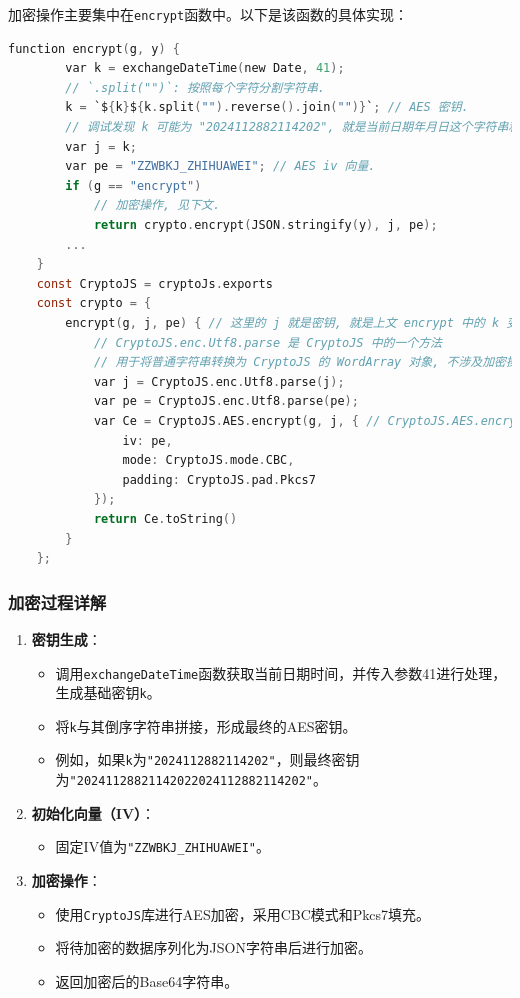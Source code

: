 \documentclass[14pt,a4paper,UTF8,twoside]{article}
\begin{document}
加密操作主要集中在\texttt{encrypt}函数中。以下是该函数的具体实现：

\begin{lstlisting}[language=C, caption=加密函数代码]
    function encrypt(g, y) {
        var k = exchangeDateTime(new Date, 41);
        // `.split("")`: 按照每个字符分割字符串.
        k = `${k}${k.split("").reverse().join("")}`; // AES 密钥.
        // 调试发现 k 可能为 "2024112882114202", 就是当前日期年月日这个字符串和他的倒转相加.
        var j = k;
        var pe = "ZZWBKJ_ZHIHUAWEI"; // AES iv 向量.
        if (g == "encrypt")
            // 加密操作, 见下文.
            return crypto.encrypt(JSON.stringify(y), j, pe);
        ...
    }
    const CryptoJS = cryptoJs.exports
    const crypto = {
        encrypt(g, j, pe) { // 这里的 j 就是密钥, 就是上文 encrypt 中的 k 变量.
            // CryptoJS.enc.Utf8.parse 是 CryptoJS 中的一个方法
            // 用于将普通字符串转换为 CryptoJS 的 WordArray 对象, 不涉及加密操作.
            var j = CryptoJS.enc.Utf8.parse(j);
            var pe = CryptoJS.enc.Utf8.parse(pe);
            var Ce = CryptoJS.AES.encrypt(g, j, { // CryptoJS.AES.encrypt(message, key, options)
                iv: pe,
                mode: CryptoJS.mode.CBC,
                padding: CryptoJS.pad.Pkcs7
            });
            return Ce.toString()
        }
    };
\end{lstlisting}

\subsubsection*{加密过程详解}

\begin{enumerate}
    \item \textbf{密钥生成}：
    \begin{itemize}
        \item 调用\texttt{exchangeDateTime}函数获取当前日期时间，并传入参数41进行处理，生成基础密钥\texttt{k}。
        \item 将\texttt{k}与其倒序字符串拼接，形成最终的AES密钥。
        \item 例如，如果\texttt{k}为\texttt{"2024112882114202"}，则最终密钥为\texttt{"20241128821142022024112882114202"}。
    \end{itemize}
    
    \item \textbf{初始化向量（IV）}：
    \begin{itemize}
        \item 固定IV值为\texttt{"ZZWBKJ\_ZHIHUAWEI"}。
    \end{itemize}
    
    \item \textbf{加密操作}：
    \begin{itemize}
        \item 使用\texttt{CryptoJS}库进行AES加密，采用CBC模式和Pkcs7填充。
        \item 将待加密的数据序列化为JSON字符串后进行加密。
        \item 返回加密后的Base64字符串。
    \end{itemize}
\end{enumerate}
\end{document}
